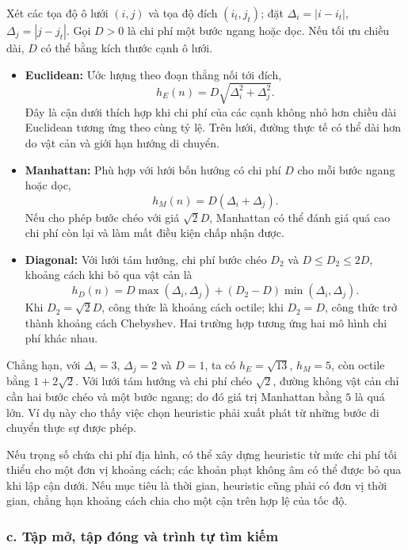 \documentclass[12pt,a4paper,oneside]{report}
\begin{document}
Xét các tọa độ ô lưới \((i,j)\) và tọa độ đích \((i_t,j_t)\); đặt \(\Delta_i=|i-i_t|\), \(\Delta_j=|j-j_t|\). Gọi \(D>0\) là chi phí một bước ngang hoặc dọc. Nếu tối ưu chiều dài, \(D\) có thể bằng kích thước cạnh ô lưới.
\begin{itemize}
  \item \textbf{Euclidean:} Ước lượng theo đoạn thẳng nối tới đích,
  \[
    h_E(n)=D\sqrt{\Delta_i^{2}+\Delta_j^{2}}.
  \]
  Đây là cận dưới thích hợp khi chi phí của các cạnh không nhỏ hơn chiều dài Euclidean tương ứng theo cùng tỷ lệ. Trên lưới, đường thực tế có thể dài hơn do vật cản và giới hạn hướng di chuyển.
  \item \textbf{Manhattan:} Phù hợp với lưới bốn hướng có chi phí \(D\) cho mỗi bước ngang hoặc dọc,
  \[
    h_M(n)=D(\Delta_i+\Delta_j).
  \]
  Nếu cho phép bước chéo với giá \(\sqrt{2}D\), Manhattan có thể đánh giá quá cao chi phí còn lại và làm mất điều kiện chấp nhận được.
  \item \textbf{Diagonal:} Với lưới tám hướng, chi phí bước chéo \(D_2\) và \(D\leq D_2\leq 2D\), khoảng cách khi bỏ qua vật cản là
  \begin{equation}
    h_D(n)=D\max(\Delta_i,\Delta_j)
      +(D_2-D)\min(\Delta_i,\Delta_j).
    \label{eq:diagonal-heuristic}
  \end{equation}
  Khi \(D_2=\sqrt{2}D\), công thức là khoảng cách octile; khi \(D_2=D\), công thức trở thành khoảng cách Chebyshev. Hai trường hợp tương ứng hai mô hình chi phí khác nhau.
\end{itemize}
Chẳng hạn, với \(\Delta_i=3\), \(\Delta_j=2\) và \(D=1\), ta có \(h_E=\sqrt{13}\), \(h_M=5\), còn octile bằng \(1+2\sqrt{2}\). Với lưới tám hướng và chi phí chéo \(\sqrt{2}\), đường không vật cản chỉ cần hai bước chéo và một bước ngang; do đó giá trị Manhattan bằng \(5\) là quá lớn. Ví dụ này cho thấy việc chọn heuristic phải xuất phát từ những bước di chuyển thực sự được phép.

Nếu trọng số chứa chi phí địa hình, có thể xây dựng heuristic từ mức chi phí tối thiểu cho một đơn vị khoảng cách; các khoản phạt không âm có thể được bỏ qua khi lập cận dưới. Nếu mục tiêu là thời gian, heuristic cũng phải có đơn vị thời gian, chẳng hạn khoảng cách chia cho một cận trên hợp lệ của tốc độ.

\subsubsection*{c. Tập mở, tập đóng và trình tự tìm kiếm}
\end{document}
